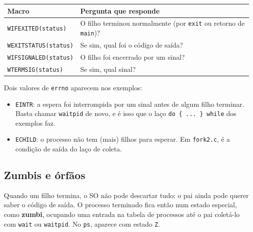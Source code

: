 \documentclass[11pt,a4paper]{article}
\newcommand{\cmd}[1]{\texttt{#1}}
\begin{document}
\begin{center}
\begin{tabular}{@{}ll@{}}
\toprule
\textbf{Macro} & \textbf{Pergunta que responde} \\
\midrule
\cmd{WIFEXITED(status)} & O filho terminou normalmente (por \cmd{exit} ou retorno de \cmd{main})? \\
\cmd{WEXITSTATUS(status)} & Se sim, qual foi o código de saída? \\
\cmd{WIFSIGNALED(status)} & O filho foi encerrado por um sinal? \\
\cmd{WTERMSIG(status)} & Se sim, qual sinal? \\
\bottomrule
\end{tabular}
\end{center}

Dois valores de \cmd{errno} aparecem nos exemplos:

\begin{itemize}
    \item \cmd{EINTR}: a espera foi interrompida por um sinal antes de algum filho terminar. Basta chamar \cmd{waitpid} de novo, e é isso que o laço \cmd{do \{ ... \} while} dos exemplos faz.
    \item \cmd{ECHILD}: o processo não tem (mais) filhos para esperar. Em \cmd{fork2.c}, é a condição de saída do laço de coleta.
\end{itemize}

\subsection{Zumbis e órfãos}

Quando um filho termina, o SO não pode descartar tudo: o pai ainda pode querer saber o código de saída. O processo terminado fica então num estado especial, como \textbf{zumbi}, ocupando uma entrada na tabela de processos até o pai coletá-lo com \cmd{wait} ou \cmd{waitpid}. No \cmd{ps}, aparece com estado \cmd{Z}.

\begin{center}
\end{center}
\end{document}
